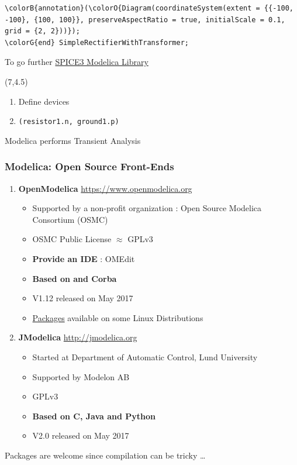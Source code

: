 \begin{frame}[fragile]
\begin{Verbatim}[commandchars=\\\{\}]
  \colorB{annotation}(\colorO{Diagram(coordinateSystem(extent = {{-100, -100}, {100, 100}}, preserveAspectRatio = true, initialScale = 0.1, grid = {2, 2}))});
\colorG{end} SimpleRectifierWithTransformer;
\end{Verbatim}
  \normalsize
  \begin{flushright}
   \tiny%
    To go further \href{https://www.modelica.org/events/modelica2009/Proceedings/memorystick/pages/papers/0019/0019.pdf}{SPICE3 Modelica Library}
  \end{flushright}
  \begin{textblock}{8}(7,4.5)
    \begin{enumerate}
    \item Define devices
    \item \texttt{(resistor1.n, ground1.p)} \\[1em]
    \end{enumerate}
    \attention{} \alert{Modelica performs Transient Analysis}
  \end{textblock}
\end{frame}

\begin{frame}
  \frametitle{Modelica: Open Source Front-Ends}
  \begin{enumerate}
  \item \textbf{OpenModelica} \hfill {\small \url{https://www.openmodelica.org}}
    \begin{itemize}
    \item Supported by a non-profit organization : Open Source Modelica Consortium (OSMC)
    \item OSMC Public License $\approx$ GPLv3
    \item \textbf{Provide an IDE} : OMEdit
    \item \textbf{Based on \Cpp{} and Corba}
    \item V1.12 released on May 2017
    \item \href{https://build.openmodelica.org}{Packages} available on some Linux Distributions \\[1em]
    \end{itemize}
  \item \textbf{JModelica} \hfill {\small \url{http://jmodelica.org}}
    \begin{itemize}
    \item Started at Department of Automatic Control, Lund University
    \item Supported by Modelon AB
    \item GPLv3
    \item \textbf{Based on C, Java and Python}
    \item V2.0 released on May 2017
    \end{itemize}
  \end{enumerate}
  \centerline{\attention{} \alert{Packages are welcome since compilation can be tricky \ldots}}
\end{frame}


